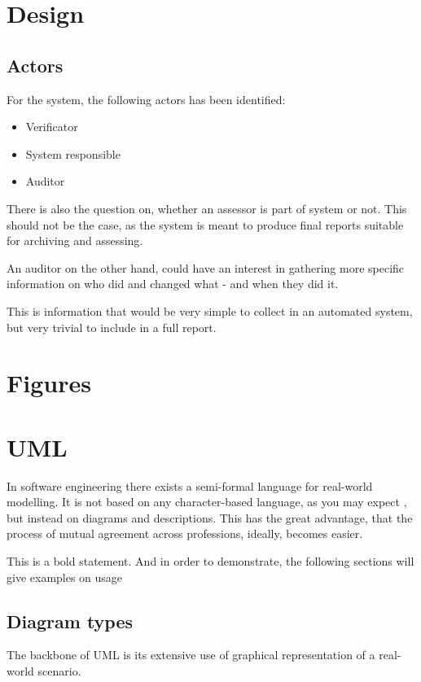 \documentclass[10pt,a4paper]{article}
\begin{document}
\section{Design}

\subsection{Actors}
For the system, the following actors has been identified:
\begin{itemize}
  \item Verificator
  \item System responsible
  \item Auditor
\end{itemize}
There is also the question on, whether an assessor is part of system or not. This should not be the case, as the system is meant to produce final reports suitable for archiving and assessing.

An auditor on the other hand, could have an interest in gathering more specific information on who did and changed what - and when they did it.

This is information that would be very simple to collect in an automated system, but very trivial to include in a full report.




\appendix
\section{Figures}
\listoffigures

\section{UML}
In software engineering there exists a semi-formal language for real-world modelling. It is not based on any character-based language, as you may expect , but instead on diagrams and descriptions. This has the great advantage, that the process of mutual agreement across professions, ideally, becomes easier.

This is a bold statement. And in order to demonstrate, the following sections will give examples on usage
\subsection{Diagram types}
The backbone of UML is its extensive use of graphical representation of a real-world scenario. 
\end{document}
